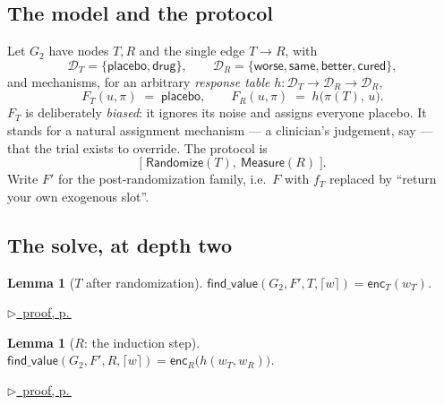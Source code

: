\documentclass[11pt,a4paper]{article}
\theoremstyle{definition}
\theoremstyle{plain}
\newtheorem{lemma}[definition]{Lemma}
\theoremstyle{remark}
\newcommand{\dom}{\mathcal{D}}
\newcommand{\enc}{\mathsf{enc}}
\newcommand{\fv}{\mathsf{find\_value}}
\newcommand{\pfref}[1]{%
  \par\smallskip\noindent
  \hyperref[pf:#1]{\small$\triangleright$\ proof, p.\,\pageref{pf:#1}}\par\smallskip}
\begin{document}
\subsection{The model and the protocol}

Let $G_2$ have nodes $T, R$ and the single edge $T \to R$, with
\[
  \dom_T = \{\textsf{placebo}, \textsf{drug}\},
  \qquad
  \dom_R = \{\textsf{worse}, \textsf{same}, \textsf{better}, \textsf{cured}\},
\]
and mechanisms, for an arbitrary \emph{response table}
$h : \dom_T \to \dom_R \to \dom_R$,
\[
  F_T(u,\pi) \;=\; \textsf{placebo},
  \qquad
  F_R(u,\pi) \;=\; h\bigl(\pi(T),\, u\bigr).
\]
$F_T$ is deliberately \emph{biased}: it ignores its noise and assigns
everyone placebo. It stands for a natural assignment mechanism --- a
clinician's judgement, say --- that the trial exists to override. The
protocol is
\[
  \bigl[\;\mathsf{Randomize}(T),\ \mathsf{Measure}(R)\;\bigr].
\]
Write $F'$ for the post-randomization family, i.e.\ $F$ with $f_T$ replaced
by ``return your own exogenous slot''.

\subsection{The solve, at depth two}

\begin{lemma}[$T$ after randomization]
\label{lem:rct2T}
$\fv(G_2, F', T, \lceil w \rceil) = \enc_T(w_T)$.
\end{lemma}

\pfref{lem:rct2T}

\begin{lemma}[$R$: the induction step]
\label{lem:rct2R}
$\fv(G_2, F', R, \lceil w \rceil) = \enc_R\bigl(h(w_T, w_R)\bigr)$.
\end{lemma}

\pfref{lem:rct2R}
\end{document}
